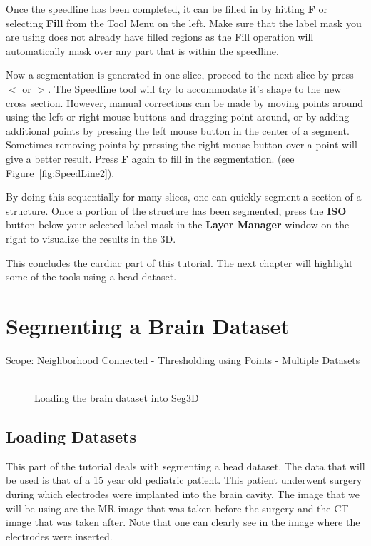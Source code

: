 \documentclass[fleqn,11pt,openany]{book}
\begin{document}
Once the speedline has been completed, it can be filled in by hitting {\bf F} or selecting {\bf Fill} from the Tool Menu on the left. Make sure that the label mask you are using does not already have filled regions as the Fill operation will automatically mask over any part that is within the speedline.

Now a segmentation is generated in one slice, proceed to the next slice by press {\bf $<$} or {\bf $>$}. The Speedline tool will try to accommodate it's shape to the new cross section. However, manual corrections can be made by moving points around using the left or right mouse buttons and dragging point around, or by adding additional points by pressing the left mouse button in the center of a segment. Sometimes removing points by pressing the right mouse button over a point will give a better result. Press {\bf F} again to fill in the segmentation. (see Figure~\ref{fig:SpeedLine2}).

By doing this sequentially for many slices, one can quickly segment a section of a structure. Once a portion of the structure has been segmented, press the {\bf ISO \Forward} button below your selected label mask in the {\bf Layer Manager} window on the right to visualize the results in the 3D.

This concludes the cardiac part of this tutorial. The next chapter will highlight some of the tools using a head dataset.


\chapter{Segmenting a Brain Dataset}

\begin{introduction}
Scope: Neighborhood Connected - Thresholding using Points - Multiple Datasets - 
\end{introduction}

\begin{figure}
\caption{Loading the brain dataset into Seg3D}\label{fig:LoadingBrainDataSet}
\end{figure}

\section{Loading Datasets}

This part of the tutorial deals with segmenting a head dataset. The data that will be used is that of a 15 year old pediatric patient. This patient underwent surgery during which electrodes were implanted into the brain cavity. The image that we will be using are the MR image that was taken before the surgery and the CT image that was taken after. Note that one can clearly see in the image where the electrodes were inserted.
\end{document}

